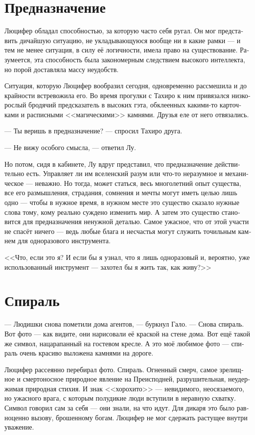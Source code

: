 \documentclass[a4paper,12pt,fleqn]{book}\usepackage{polyglossia}\setdefaultlanguage[babelshorthands=true]{russian}\setotherlanguage{english}\defaultfontfeatures{Ligatures=TeX,Mapping=tex-text}\usepackage{xcolor}\newcommand{\ml}[3]{#2}
\begin{document}
{\section{Предназначение}

Люцифер обладал способностью, за которую часто себя ругал.
Он мог представить дичайшую ситуацию, не укладывающуюся вообще ни в какие рамки --- и тем не менее ситуация, в силу её логичности, имела право на существование.
Разумеется, эта способность была закономерным следствием высокого интеллекта, но порой доставляла массу неудобств.

Ситуация, которую Люцифер вообразил сегодня, одновременно рассмешила и до крайности встревожила его.
Во время прогулки с Тахиро к ним привязался низкорослый бродячий предсказатель в высоких гэта, обклеенных какими-то карточками и расписными <<магическими>> камнями.
Друзья еле от него отвязались.

--- Ты веришь в предназначение? --- спросил Тахиро друга.

--- Не вижу особого смысла, --- ответил Лу.

Но потом, сидя в кабинете, Лу вдруг представил, что предназначение действительно есть.
Управляет ли им вселенский разум или что-то неразумное и механическое --- неважно.
Но тогда, может статься, весь многолетний опыт существа, все его размышления, страдания, сомнения и мечты могут иметь целью лишь одно --- чтобы в нужное время, в нужном месте это существо сказало нужные слова тому, кому реально суждено изменить мир.
А затем это существо становится для предназначения ненужной деталью.
Самое ужасное, что от этой участи не спасёт ничего --- ведь любые блага и несчастья могут служить точильным камнем для одноразового инструмента.

<<Что, если это я?
И если бы я узнал, что я лишь одноразовый и, вероятно, уже использованный инструмент --- захотел бы я жить так, как живу?>>

\section{Спираль}

--- Людишки снова пометили дома агентов, --- буркнул Гало.
--- Снова спираль.
Вот фото --- как видите, они нарисовали её краской на стене дома.
Вот ещё такой же символ, нацарапанный на гостевом кресле.
А это моё любимое фото --- спираль очень красиво выложена камнями на дороге.

Люцифер рассеянно перебирал фото.
Спираль.
Огненный смерч, самое зрелищное и смертоносное природное явление на Преисподней, разрушительная, неудержимая природная стихия.
И знак <<хорохито>> --- невидимого, неосязаемого, но ужасного врага, с которым полудикие люди вступили в неравную схватку.
Символ говорил сам за себя --- они знали, на что идут.
Для дикаря это было равноценно вызову, брошенному богам.
Люцифер не мог сдержать растущее внутри уважение.

}
\end{document}
